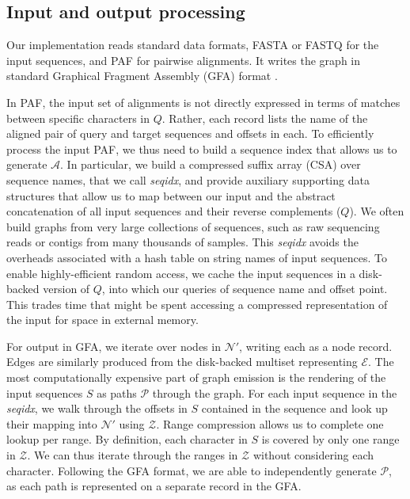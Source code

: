 \documentclass{bioinfo}
\theoremstyle{definition}
\begin{document}
\subsection{Input and output processing}

Our implementation reads standard data formats, FASTA or FASTQ for the input sequences, and PAF \citep{Li_2018} for pairwise alignments.
It writes the graph in standard Graphical Fragment Assembly (GFA) format \citep{GFA}.

In PAF, the input set of alignments is not directly expressed in terms of matches between specific characters in $Q$.
Rather, each record lists the name of the aligned pair of query and target sequences and offsets in each.
To efficiently process the input PAF, we thus need to build a sequence index that allows us to generate $\mathcal{A}$.
In particular, we build a compressed suffix array (CSA) \citep{Sadakane_2000} over sequence names, that we call \textit{seqidx}, and provide auxiliary supporting data structures that allow us to map between our input and the abstract concatenation of all input sequences and their reverse complements ($Q$).
We often build graphs from very large collections of sequences, such as raw sequencing reads or contigs from many thousands of samples.
This \textit{seqidx} avoids the overheads associated with a hash table on string names of input sequences.
To enable highly-efficient random access, we cache the input sequences in a disk-backed version of $Q$, into which our queries of sequence name and offset point.
This trades time that might be spent accessing a compressed representation of the input for space in external memory.

For output in GFA, we iterate over nodes in $\mathcal{N}'$, writing each as a node record.
Edges are similarly produced from the disk-backed multiset representing $\mathcal{E}$.
The most computationally expensive part of graph emission is the rendering of the input sequences $S$ as paths $\mathcal{P}$ through the graph.
For each input sequence in the \textit{seqidx}, we walk through the offsets in $S$ contained in the sequence and look up their mapping into $\mathcal{N}'$ using $\mathcal{Z}$.
Range compression allows us to complete one lookup per range.
By definition, each character in $S$ is covered by only one range in $\mathcal{Z}$.
We can thus iterate through the ranges in $\mathcal{Z}$ without considering each character.
Following the GFA format, we are able to independently generate $\mathcal{P}$, as each path is represented on a separate record in the GFA.
\end{document}

